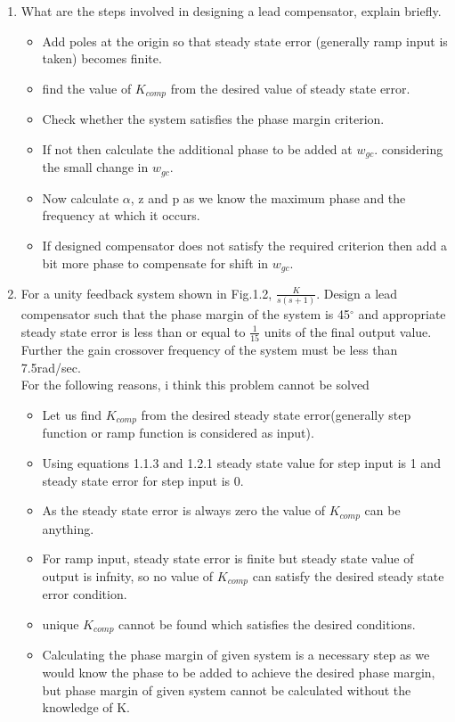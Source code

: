 \begin{enumerate}[label=\thesection.\arabic*.,ref=\thesection.\theenumi]
\item What are the steps involved in designing a lead compensator, explain briefly. \\ 
\solution
\begin{itemize}
    \item Add poles at the origin so that steady state error (generally ramp input is taken) becomes finite.
    \item find the value of $K_{comp}$ from the desired value of steady state error.
    \item Check whether the system satisfies the phase margin criterion.
    \item If not then calculate the additional phase to be added at $w_{gc}$. considering the small change in $w_{gc}$.
    \item Now calculate $\alpha$, z and p as we know the maximum phase and the frequency at which it occurs.
    \item If designed compensator does not satisfy the required criterion then add a bit more phase to compensate for shift in $w_{gc}$.
\end{itemize}


\item For a unity feedback system shown in Fig.1.2, $\frac{K}{s(s+1)}$. Design a lead compensator such that the phase margin of the system is 45$^{\circ}$ and appropriate steady state error is less than or equal to $\frac{1}{15}$ units of the final output value. Further the gain crossover frequency of the system must be less than 7.5rad/sec. \\

\solution 
For the following reasons, i think this problem cannot be solved
\begin{itemize}
    \item Let us find $K_{comp}$ from the desired steady state error(generally step function or ramp function is considered as input).
    \item Using equations 1.1.3 and 1.2.1 steady state value for step input is 1 and steady state error for step input is 0.
    \item As the steady state error is always zero the value of $K_{comp}$ can be anything.
    \item For ramp input, steady state error is finite but steady state value of output is infnity, so no value of $K_{comp}$ can satisfy the desired steady state error condition. 
    \item unique $K_{comp}$ cannot be found which satisfies the desired conditions.
    \item Calculating the phase margin of given system is a necessary step as we would know the phase to be added to achieve the desired phase margin, but phase margin of given system cannot be calculated without the knowledge of K. 
\end{itemize}


\end{enumerate}
